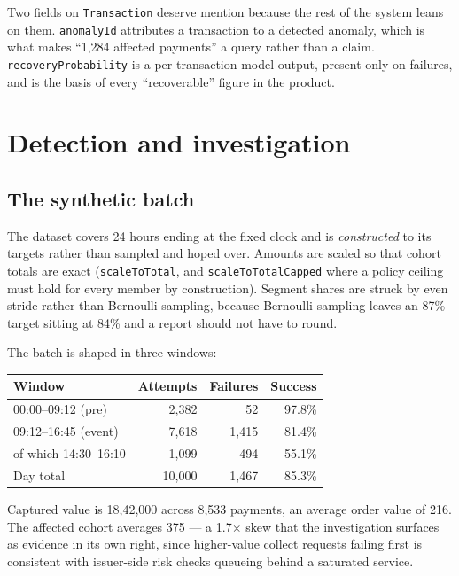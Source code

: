 \documentclass[10pt,twocolumn,a4paper]{article}
\newcommand{\rs}{\rupee}%
\newcommand{\rs}{\textrm{INR}\,}%
\newcommand{\code}[1]{\texttt{\small #1}}
\begin{document}
Two fields on \code{Transaction} deserve mention because the rest of the system
leans on them. \code{anomalyId} attributes a transaction to a detected anomaly,
which is what makes ``1{,}284 affected payments'' a query rather than a claim.
\code{recoveryProbability} is a per-transaction model output, present only on
failures, and is the basis of every ``recoverable'' figure in the product.

\section{Detection and investigation}
\label{sec:detect}

\subsection{The synthetic batch}

The dataset covers 24 hours ending at the fixed clock and is \emph{constructed}
to its targets rather than sampled and hoped over. Amounts are scaled so that
cohort totals are exact (\code{scaleToTotal}, and \code{scaleToTotalCapped}
where a policy ceiling must hold for every member by construction). Segment
shares are struck by even stride rather than Bernoulli sampling, because
Bernoulli sampling leaves an 87\% target sitting at 84\% and a report should not
have to round.

The batch is shaped in three windows:

\begin{table}[h]
\centering
\small
\begin{tabular}{@{}l r r r@{}}
\toprule
\textbf{Window} & \textbf{Attempts} & \textbf{Failures} & \textbf{Success} \\
\midrule
00:00--09:12 (pre)   & 2{,}382 & 52    & 97.8\% \\
09:12--16:45 (event) & 7{,}618 & 1{,}415 & 81.4\% \\
\quad of which 14:30--16:10 & 1{,}099 & 494 & 55.1\% \\
\midrule
Day total            & 10{,}000 & 1{,}467 & 85.3\% \\
\bottomrule
\end{tabular}
\end{table}

Captured value is \rs{}18{,}42{,}000 across 8{,}533 payments, an average order
value of \rs{}216. The affected cohort averages \rs{}375 --- a 1.7$\times$ skew
that the investigation surfaces as evidence in its own right, since
higher-value collect requests failing first is consistent with issuer-side risk
checks queueing behind a saturated service.
\end{document}

